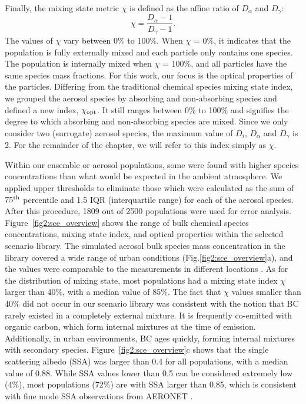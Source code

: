 \documentclass[edeposit,fullpage]{uiucthesis2009}
\begin{document}
Finally, the mixing state metric $\chi$ is defined as the affine ratio
of $D_\alpha$ and $D_\gamma$:
\begin{equation}
\chi = \frac{D_\alpha - 1}{D_\gamma - 1}.
\end{equation}
The values of $\chi$ vary between 0\% to 100\%. When $\chi$ = 0\%, it
indicates that the population is fully externally mixed and each
particle only contains one species. The population is internally mixed
when $\chi$ = 100\%, and all particles have the same species mass
fractions.  For this work, our focus is the optical properties of the
particles. Differing from the traditional chemical species mixing
state index, we grouped the aerosol species by absorbing and
non-absorbing species and defined a new index, $\chi_{\rm opt}$. It
still ranges between 0\% to 100\% and signifies the degree to which
absorbing and non-absorbing species are mixed. Since we only consider
two (surrogate) aerosol species, the maximum value of $D_i$,
$D_\alpha$ and $D_\gamma$ is 2. For the remainder of the chapter, we
will refer to this index simply as $\chi$.

Within our ensemble or aerosol populations, some were found with
higher species concentrations than what would be expected in the
ambient atmosphere. We applied upper thresholds to eliminate those
which were calculated as the sum of $\rm 75^{th}$ percentile and 1.5
IQR (interquartile range) for each of the aerosol species. After this
procedure, 1809 out of 2500 populations were used for error analysis.
Figure~\ref{fig2:sce_overview} shows the range of bulk chemical
species concentrations, mixing state index, and optical properties
within the selected scenario library. The simulated aerosol bulk
species mass concentration in the library covered a wide range of
urban conditions (Fig.\ref{fig2:sce_overview}a), and the values were
comparable to the measurements in different locations
\citep{jimenez2009evolution,lanz2010characterization}. As for the
distribution of mixing state, most populations had a mixing state
index $\chi$ larger than 40\%, with a median value of 85\%.  The fact
that $\chi$ values smaller than 40\% did not occur in our scenario
library was consistent with the notion that BC rarely existed in a
completely external mixture. It is frequently co-emitted with organic
carbon, which form internal mixtures at the time of
emission. Additionally, in urban environments, BC ages quickly,
forming internal mixtures with secondary species.
Figure~\ref{fig2:sce_overview}c shows that the single scattering
albedo (SSA) was larger than 0.4 for all populations, with a median
value of 0.88. While SSA values lower than 0.5 can be considered
extremely low (4\%), most populations (72\%) are with SSA larger than
0.85, which is consistent with fine mode SSA observations from AERONET
\citep{levy2007global}.
\end{document}

